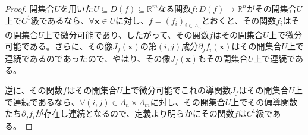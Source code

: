 \documentclass[dvipdfmx]{jsarticle}
\begin{document}
\begin{proof}
開集合$U$を用いた$U \subseteq D(f) \subseteq \mathbb{R}^{m}$なる関数$f:D(f) \rightarrow \mathbb{R}^{n}$がその開集合$U$上で$C^{1}$級であるなら、$\forall\mathbf{x} \in U$に対し、$f = \left( f_{i} \right)_{i \in \varLambda_{n}}$とおくと、その関数$f_{i}$はその開集合$U$上で微分可能であり、したがって、その関数$f$はその開集合$U$上で微分可能である。さらに、その像$J_{f}\left( \mathbf{x} \right)$の第$(i,j)$成分$\partial_{j}f_{i}\left( \mathbf{x} \right)$はその開集合$U$上で連続であるのであったので、やはり、その像$J_{f}\left( \mathbf{x} \right)$もその開集合$U$上で連続である。\par
逆に、その関数$f$はその開集合$U$上で微分可能でこれの導関数$J_{f}$はその開集合$U$上で連続であるなら、$\forall(i,j) \in \varLambda_{n} \times \varLambda_{m}$に対し、その開集合$U$上でその偏導関数たち$\partial_{j}f_{i}$が存在し連続となるので、定義より明らかにその関数$f$は$C^{1}$級である。
\end{proof}
\end{document}
